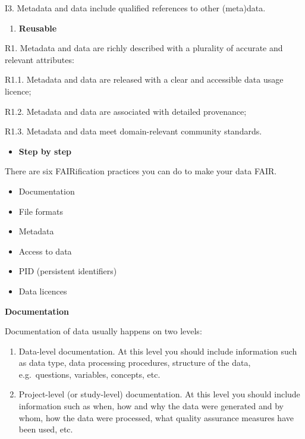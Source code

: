 \documentclass[
]{book}
\providecommand{\tightlist}{%
  \setlength{\itemsep}{0pt}\setlength{\parskip}{0pt}}
\begin{document}
I3. Metadata and data include qualified references to other (meta)data.

\begin{enumerate}
\def\labelenumi{\arabic{enumi}.}
\tightlist
\item
  \textbf{Reusable}
\end{enumerate}

R1. Metadata and data are richly described with a plurality of accurate and relevant attributes:

R1.1. Metadata and data are released with a clear and accessible data usage licence;

R1.2. Metadata and data are associated with detailed provenance;

R1.3. Metadata and data meet domain-relevant community standards.

\begin{itemize}
\tightlist
\item
  \textbf{Step by step}
\end{itemize}

There are six FAIRification practices you can do to make your data FAIR.

\begin{itemize}
\tightlist
\item
  Documentation
\item
  File formats
\item
  Metadata
\item
  Access to data
\item
  PID (persistent identifiers)
\item
  Data licences
\end{itemize}

\textbf{Documentation}

Documentation of data usually happens on two levels:

\begin{enumerate}
\def\labelenumi{\arabic{enumi}.}
\tightlist
\item
  Data-level documentation. At this level you should include information such as data type, data processing procedures, structure of the data, e.g.~questions, variables, concepts, etc.
\item
  Project-level (or study-level) documentation. At this level you should include information such as when, how and why the data were generated and by whom, how the data were processed, what quality assurance measures have been used, etc.
\end{enumerate}
\end{document}
